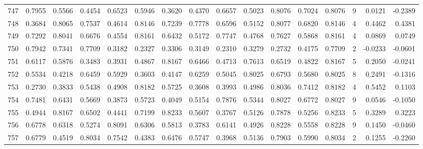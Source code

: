 \begin{tabular}{lrrrrrrrrrrrrrrr}
747 &      0.7955 &  0.5566 &  0.4454 &  0.6523 &  0.5946 &  0.3620 &  0.4370 &  0.6657 &  0.5023 &  0.8076 &   0.7024 &     0.8076 &      9 &                    0.0121 &                    -0.2389 \\
748 &      0.3684 &  0.8065 &  0.7537 &  0.4614 &  0.8146 &  0.7239 &  0.7778 &  0.6596 &  0.5152 &  0.8077 &   0.6820 &     0.8146 &      4 &                    0.4462 &                     0.4381 \\
749 &      0.7292 &  0.8041 &  0.6676 &  0.4554 &  0.8161 &  0.6432 &  0.5172 &  0.7747 &  0.4768 &  0.7627 &   0.5868 &     0.8161 &      4 &                    0.0869 &                     0.0749 \\
750 &      0.7942 &  0.7341 &  0.7709 &  0.3182 &  0.2327 &  0.3306 &  0.3149 &  0.2310 &  0.3279 &  0.2732 &   0.4175 &     0.7709 &      2 &                   -0.0233 &                    -0.0601 \\
751 &      0.6117 &  0.5876 &  0.3483 &  0.3931 &  0.4867 &  0.8167 &  0.6466 &  0.4713 &  0.7613 &  0.6519 &   0.4822 &     0.8167 &      5 &                    0.2050 &                    -0.0241 \\
752 &      0.5534 &  0.4218 &  0.6459 &  0.5929 &  0.3603 &  0.4147 &  0.6259 &  0.5045 &  0.8025 &  0.6793 &   0.5680 &     0.8025 &      8 &                    0.2491 &                    -0.1316 \\
753 &      0.2730 &  0.3833 &  0.5438 &  0.4908 &  0.8182 &  0.5725 &  0.3608 &  0.3993 &  0.4986 &  0.8036 &   0.7412 &     0.8182 &      4 &                    0.5452 &                     0.1103 \\
754 &      0.7481 &  0.6431 &  0.5669 &  0.3873 &  0.5723 &  0.4049 &  0.5154 &  0.7876 &  0.5344 &  0.8027 &   0.6772 &     0.8027 &      9 &                    0.0546 &                    -0.1050 \\
755 &      0.4944 &  0.8167 &  0.6502 &  0.4441 &  0.7199 &  0.8233 &  0.5607 &  0.3767 &  0.5126 &  0.7878 &   0.5256 &     0.8233 &      5 &                    0.3289 &                     0.3223 \\
756 &      0.6778 &  0.6318 &  0.5274 &  0.8091 &  0.6306 &  0.5813 &  0.3783 &  0.6141 &  0.4926 &  0.8228 &   0.5558 &     0.8228 &      9 &                    0.1450 &                    -0.0460 \\
757 &      0.6779 &  0.4519 &  0.8034 &  0.7542 &  0.4383 &  0.6476 &  0.5747 &  0.3968 &  0.5136 &  0.7903 &   0.5990 &     0.8034 &      2 &                    0.1255 &                    -0.2260 \\

\end{tabular}
